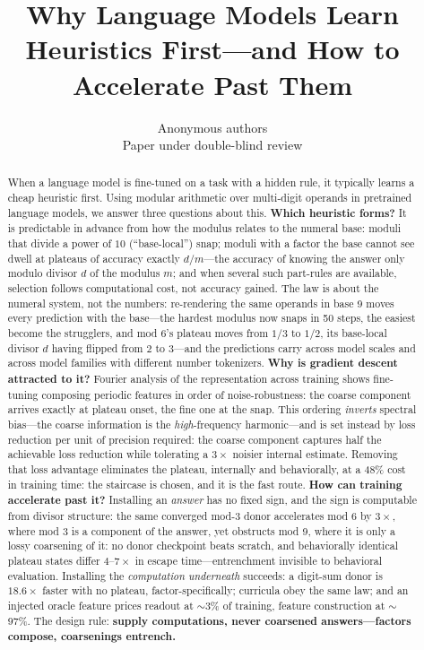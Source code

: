 \documentclass{article} %
\title{Why Language Models Learn Heuristics First---and How to Accelerate Past Them}
\author{Anonymous authors\\
Paper under double-blind review}
\begin{document}
\maketitle

\begin{abstract}
When a language model is fine-tuned on a task with a hidden rule, it typically learns a cheap heuristic first. Using modular arithmetic over multi-digit operands in pretrained language models, we answer three questions about this. \textbf{Which heuristic forms?} It is predictable in advance from how the modulus relates to the numeral base: moduli that divide a power of $10$ (``base-local'') snap; moduli with a factor the base cannot see dwell at plateaus of accuracy exactly $d/m$---the accuracy of knowing the answer only modulo divisor $d$ of the modulus $m$; and when several such part-rules are available, selection follows computational cost, not accuracy gained. The law is about the numeral system, not the numbers: re-rendering the same operands in base 9 moves every prediction with the base---the hardest modulus now snaps in 50 steps, the easiest become the strugglers, and mod 6's plateau moves from $1/3$ to $1/2$, its base-local divisor $d$ having flipped from $2$ to $3$---and the predictions carry across model scales and across model families with different number tokenizers. \textbf{Why is gradient descent attracted to it?} Fourier analysis of the representation across training shows fine-tuning composing periodic features in order of noise-robustness: the coarse component arrives exactly at plateau onset, the fine one at the snap. This ordering \emph{inverts} spectral bias---the coarse information is the \emph{high}-frequency harmonic---and is set instead by loss reduction per unit of precision required: the coarse component captures half the achievable loss reduction while tolerating a $3\times$ noisier internal estimate. Removing that loss advantage eliminates the plateau, internally and behaviorally, at a 48\% cost in training time: the staircase is chosen, and it is the fast route. \textbf{How can training accelerate past it?} Installing an \emph{answer} has no fixed sign, and the sign is computable from divisor structure: the same converged mod-3 donor accelerates mod 6 by $3\times$, where mod 3 is a component of the answer, yet obstructs mod 9, where it is only a lossy coarsening of it: no donor checkpoint beats scratch, and behaviorally identical plateau states differ $4$--$7\times$ in escape time---entrenchment invisible to behavioral evaluation. Installing the \emph{computation underneath} succeeds: a digit-sum donor is $18.6\times$ faster with no plateau, factor-specifically; curricula obey the same law; and an injected oracle feature prices readout at $\sim$3\% of training, feature construction at $\sim$97\%. The design rule: \textbf{supply computations, never coarsened answers---factors compose, coarsenings entrench.}
\end{abstract}
\end{document}
